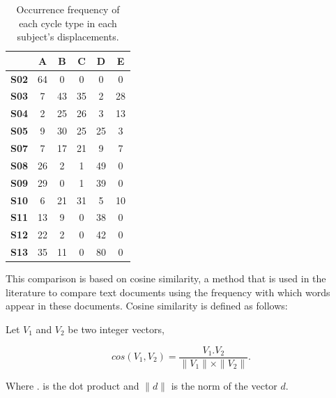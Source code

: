 \begin{table}[h]
\centering
\begin{tabular}{|c|c|c|c|c|c|}
\hline
             & \textbf{A} & \textbf{B} & \textbf{C} & \textbf{D} & \textbf{E} \\ \hline
\textbf{S02} & 64         & 0          & 0          & 0          & 0          \\ \hline
\textbf{S03} & 7          & 43         & 35         & 2          & 28         \\ \hline
\textbf{S04} & 2          & 25         & 26         & 3          & 13         \\ \hline
\textbf{S05} & 9          & 30         & 25         & 25         & 3          \\ \hline
\textbf{S07} & 7          & 17         & 21         & 9          & 7          \\ \hline
\textbf{S08} & 26         & 2          & 1          & 49         & 0          \\ \hline
\textbf{S09} & 29         & 0          & 1          & 39         & 0          \\ \hline
\textbf{S10} & 6          & 21         & 31         & 5          & 10         \\ \hline
\textbf{S11} & 13         & 9          & 0          & 38         & 0          \\ \hline
\textbf{S12}          & 22         & 2          & 0          & 42         & 0          \\ \hline
\textbf{S13}          & 35         & 11         & 0          & 80         & 0          \\ \hline
\end{tabular}
\caption{Occurrence frequency of each cycle type in each subject's displacements.}
\label{frequency2}
\end{table}

This comparison is based on cosine similarity, a method that is used in the literature to compare text documents using the frequency with which words appear in these documents. Cosine similarity is defined as follows: 

Let $V_1$ and $V_2$ be two integer vectors, 


\[
cos(V_{1},V_{2})=\frac{V_{1}. V_{2}}{\parallel V_{1}\parallel\times\parallel V_{2}\parallel}.
\]


Where $.$ is the dot product and $\parallel d \parallel$ is the norm of the vector $d$.



